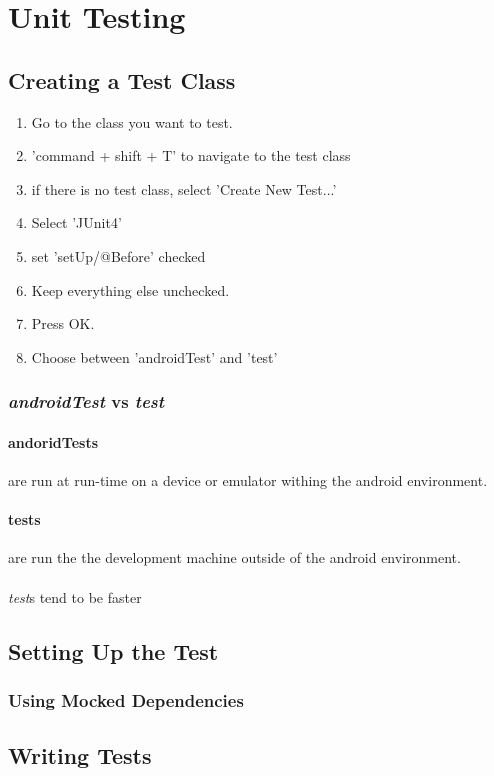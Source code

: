 \documentclass[]{article}
\begin{document}
\section{Unit Testing}
\subsection{Creating a Test Class}
\begin{enumerate}
	\item Go to the class you want to test.
	\item 'command + shift + T' to navigate to the test class
	\item if there is no test class, select 'Create New Test...'
	\item Select 'JUnit4'
	\item set 'setUp/@Before' checked
	\item Keep everything else unchecked.
	\item Press OK.
	\item Choose between 'androidTest' and 'test'
\end{enumerate}
\subsubsection{\textit{androidTest} vs \textit{test}}
\paragraph{andoridTests} are run at run-time on a device or emulator withing the android environment.
\paragraph{tests} are run the the development machine outside of the android environment.
\\\\
\textit{test}s tend to be faster

\subsection{Setting Up the Test}

\subsubsection{Using Mocked Dependencies}

\subsection{Writing Tests}
\end{document}
